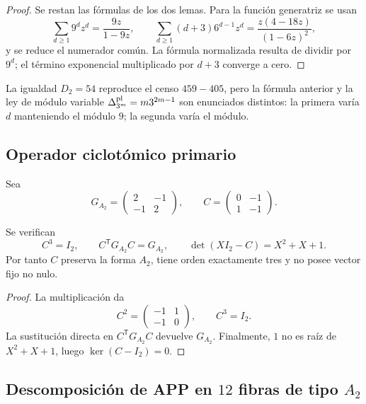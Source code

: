 \begin{proof}
Se restan las fórmulas de los dos lemas. Para la función generatriz se usan
\[
 \sum_{d\geq1}9^dz^d=\frac{9z}{1-9z},
 \qquad
 \sum_{d\geq1}(d+3)6^{d-1}z^d
 =\frac{z(4-18z)}{(1-6z)^2},
\]
y se reduce el numerador común. La fórmula normalizada resulta de dividir
por \(9^d\); el término exponencial multiplicado por \(d+3\) converge a
cero.
\end{proof}

La igualdad \(D_2=54\) reproduce el censo \(459-405\), pero la fórmula
anterior y la ley de módulo variable
\(\Delta_{3^m}^{\rm pl}=m3^{2m-1}\) son enunciados distintos: la primera
varía \(d\) manteniendo el módulo \(9\); la segunda varía el módulo.

\subsection{Operador ciclotómico primario}

Sea
\[
 G_{A_2}=\begin{pmatrix}2&-1\\-1&2\end{pmatrix},
 \qquad
 C=\begin{pmatrix}0&-1\\1&-1\end{pmatrix}.
\]

\begin{proposition}
\label{p12-83-c1-s5:prop:coxeter-a2-autonomo}
Se verifican
\[
 C^3=I_2,
 \qquad
 C^{\mathsf T}G_{A_2}C=G_{A_2},
 \qquad
 \det(XI_2-C)=X^2+X+1.
\]
Por tanto \(C\) preserva la forma \(A_2\), tiene orden exactamente tres y
no posee vector fijo no nulo.
\end{proposition}

\begin{proof}
La multiplicación da
\[
 C^2=\begin{pmatrix}-1&1\\-1&0\end{pmatrix},
 \qquad C^3=I_2.
\]
La sustitución directa en \(C^{\mathsf T}G_{A_2}C\) devuelve
\(G_{A_2}\). Finalmente, \(1\) no es raíz de \(X^2+X+1\), luego
\(\ker(C-I_2)=0\).
\end{proof}

\subsection{Descomposición de APP en \(12\) fibras de tipo \(A_2\)}

